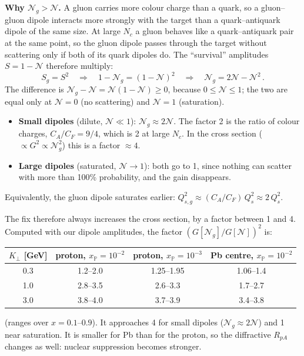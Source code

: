 \documentclass[12pt]{article}
\newcommand{\xpo}{x_{\mathbb{P}}}
\begin{document}
\textbf{Why $\mathcal{N}_g>\mathcal{N}$.} A gluon carries more colour charge than a quark, so a
gluon--gluon dipole interacts more strongly with the target than a quark--antiquark dipole of the same
size. At large $N_c$ a gluon behaves like a quark--antiquark pair at the same point, so the gluon
dipole passes through the target without scattering only if both of its quark dipoles do. The
``survival'' amplitudes $S=1-\mathcal{N}$ therefore multiply:
\[
  S_g=S^2\quad\Longrightarrow\quad 1-\mathcal{N}_g=(1-\mathcal{N})^2\quad\Longrightarrow\quad
  \mathcal{N}_g=2\mathcal{N}-\mathcal{N}^2\,.
\]
The difference is $\mathcal{N}_g-\mathcal{N}=\mathcal{N}(1-\mathcal{N})\geq0$, because
$0\leq\mathcal{N}\leq1$; the two are equal only at $\mathcal{N}=0$ (no scattering) and
$\mathcal{N}=1$ (saturation).
\begin{itemize}
\item \textbf{Small dipoles} (dilute, $\mathcal{N}\ll1$): $\mathcal{N}_g\approx2\mathcal{N}$. The factor 2
  is the ratio of colour charges, $C_A/C_F=9/4$, which is 2 at large $N_c$. In the cross section
  ($\propto G^2\propto\mathcal{N}_g^2$) this is a factor $\approx4$.
\item \textbf{Large dipoles} (saturated, $\mathcal{N}\to1$): both go to 1, since nothing can scatter with
  more than 100\% probability, and the gain disappears.
\end{itemize}
Equivalently, the gluon dipole saturates earlier: $Q_{s,g}^2\approx(C_A/C_F)\,Q_s^2\approx2\,Q_s^2$.

The fix therefore always increases the cross section, by a factor between 1 and 4. Computed with our dipole amplitudes, the factor $(G[\mathcal{N}_g]/G[\mathcal{N}])^2$ is:
\begin{center}
\begin{tabular}{cccc}
\toprule
$K_\perp$ [GeV] & proton, $\xpo=10^{-2}$ & proton, $\xpo=10^{-3}$ & Pb centre, $\xpo=10^{-2}$ \\
\midrule
0.3 & 1.2--2.0 & 1.25--1.95 & 1.06--1.4 \\
1.0 & 2.8--3.5 & 2.6--3.3   & 1.7--2.7 \\
3.0 & 3.8--4.0 & 3.7--3.9   & 3.4--3.8 \\
\bottomrule
\end{tabular}
\end{center}
(ranges over $x=0.1$--$0.9$). It approaches 4 for small dipoles ($\mathcal{N}_g\approx2\mathcal{N}$) and
1 near saturation. It is smaller for Pb than for the proton, so the diffractive $R_{pA}$ changes as
well: nuclear suppression becomes stronger.
\end{document}
